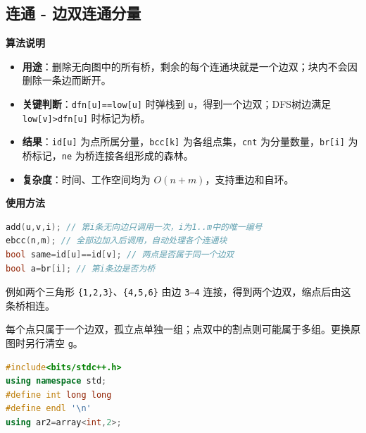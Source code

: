 \documentclass[10pt,landscape,a4paper]{article}
\begin{document}
\begin{multicols*}{3}
\subsection*{连通 - 边双连通分量}
\par\addvspace{0.7ex}\noindent\textbf{算法说明}\par\nobreak
\begin{itemize}
\item \textbf{用途}：删除无向图中的所有桥，剩余的每个连通块就是一个边双；块内不会因删除一条边而断开。
\item \textbf{关键判断}：\texttt{d\allowbreak{}f\allowbreak{}n\allowbreak{}[\allowbreak{}u\allowbreak{}]\allowbreak{}=\allowbreak{}=\allowbreak{}l\allowbreak{}o\allowbreak{}w\allowbreak{}[\allowbreak{}u\allowbreak{}]} 时弹栈到 \texttt{u}，得到一个边双；DFS树边满足 \texttt{l\allowbreak{}o\allowbreak{}w\allowbreak{}[\allowbreak{}v\allowbreak{}]\allowbreak{}\textgreater{}\allowbreak{}d\allowbreak{}f\allowbreak{}n\allowbreak{}[\allowbreak{}u\allowbreak{}]} 时标记为桥。
\item \textbf{结果}：\texttt{i\allowbreak{}d\allowbreak{}[\allowbreak{}u\allowbreak{}]} 为点所属分量，\texttt{b\allowbreak{}c\allowbreak{}c\allowbreak{}[\allowbreak{}k\allowbreak{}]} 为各组点集，\texttt{c\allowbreak{}n\allowbreak{}t} 为分量数量，\texttt{b\allowbreak{}r\allowbreak{}[\allowbreak{}i\allowbreak{}]} 为桥标记，\texttt{n\allowbreak{}e} 为桥连接各组形成的森林。
\item \textbf{复杂度}：时间、工作空间均为 $O(n+m)$，支持重边和自环。
\end{itemize}
\par\addvspace{0.7ex}\noindent\textbf{使用方法}\par\nobreak
\begin{lstlisting}[language=C++,numbers=none,basicstyle=\footnotesize\ttfamily]
add(u,v,i); // 第i条无向边只调用一次，i为1..m中的唯一编号
ebcc(n,m); // 全部边加入后调用，自动处理各个连通块
bool same=id[u]==id[v]; // 两点是否属于同一个边双
bool a=br[i]; // 第i条边是否为桥
\end{lstlisting}

例如两个三角形 \texttt{\{\allowbreak{}1\allowbreak{},\allowbreak{}2\allowbreak{},\allowbreak{}3\allowbreak{}\}}、\texttt{\{\allowbreak{}4\allowbreak{},\allowbreak{}5\allowbreak{},\allowbreak{}6\allowbreak{}\}} 由边 \texttt{3\allowbreak{}—\allowbreak{}4} 连接，得到两个边双，缩点后由这条桥相连。\par
每个点只属于一个边双，孤立点单独一组；点双中的割点则可能属于多组。更换原图时另行清空 \texttt{g}。\par
\par{}\par
\begin{lstlisting}[language=C++]
#include<bits/stdc++.h>
using namespace std;
#define int long long
#define endl '\n'
using ar2=array<int,2>;


\end{lstlisting}
\end{multicols*}
\end{document}
